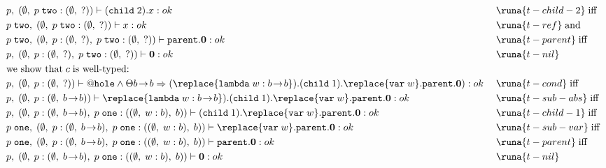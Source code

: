 \begin{align*}
%
%
&p,\; (\emptyset,\; p\; \texttt{two} : (\emptyset,\; ?)) \vdash (\texttt{child}\; 2).x : ok\; &&\runa{t-child-2}\; \text{iff}\\
%
%
&p\; \texttt{two},\; (\emptyset,\; p\; \texttt{two} : (\emptyset,\; ?)) \vdash x : ok\; &&\runa{t-ref}\; \text{and}\\
%
%
&p\; \texttt{two},\; (\emptyset,\; p : (\emptyset,\; ?),\; p\; \texttt{two} : (\emptyset,\; ?)) \vdash \texttt{parent}.\mathbf{0} : ok\; &&\runa{t-parent}\; \text{iff}\\
%
%
&p,\; (\emptyset,\; p : (\emptyset,\; ?),\; p\; \texttt{two} : (\emptyset,\; ?)) \vdash \mathbf{0} : ok\; &&\runa{t-nil}\\
%
%
&\text{we show that}\; c\; \text{is well-typed:}\\
%
%
%
&p,\; (\emptyset,\; p : (\emptyset,\; ?)) \vdash @\texttt{hole} \land \Theta b\!\rightarrow\!b \Rightarrow  (\replace{\texttt{lambda}\; w : b\!\rightarrow\!b}).(\texttt{child}\; 1).\replace{\texttt{var}\; w}.\texttt{parent}.\mathbf{0}) : ok\; &&\runa{t-cond}\; \text{iff}\\
%
%
&p,\; (\emptyset,\; p : (\emptyset,\; b\!\rightarrow\!b)) \vdash \replace{\texttt{lambda}\; w : b\!\rightarrow\!b}).(\texttt{child}\; 1).\replace{\texttt{var}\; w}.\texttt{parent}.\mathbf{0} : ok\; &&\runa{t-sub-abs}\; \text{iff}\\
%
%
&p,\; (\emptyset,\; p : (\emptyset,\; b\!\rightarrow\!b),\; p\; \texttt{one} : ((\emptyset,\; w : b),\; b)) \vdash (\texttt{child}\; 1).\replace{\texttt{var}\; w}.\texttt{parent}.\mathbf{0} : ok\; &&\runa{t-child-1}\; \text{iff}\\
%
%
&p\; \texttt{one},\; (\emptyset,\; p : (\emptyset,\; b\!\rightarrow\!b),\; p\; \texttt{one} : ((\emptyset,\; w : b),\; b)) \vdash \replace{\texttt{var}\; w}.\texttt{parent}.\mathbf{0} : ok\; &&\runa{t-sub-var}\; \text{iff}\\
%
%
&p\; \texttt{one},\; (\emptyset,\; p : (\emptyset,\; b\!\rightarrow\!b),\; p\; \texttt{one} : ((\emptyset,\; w : b),\; b)) \vdash \texttt{parent}.\mathbf{0} : ok\; &&\runa{t-parent}\; \text{iff}\\
%
%
&p,\; (\emptyset,\; p : (\emptyset,\; b\!\rightarrow\!b),\; p\; \texttt{one} : ((\emptyset,\; w : b),\; b)) \vdash \mathbf{0} : ok\; &&\runa{t-nil}
%
\end{align*}